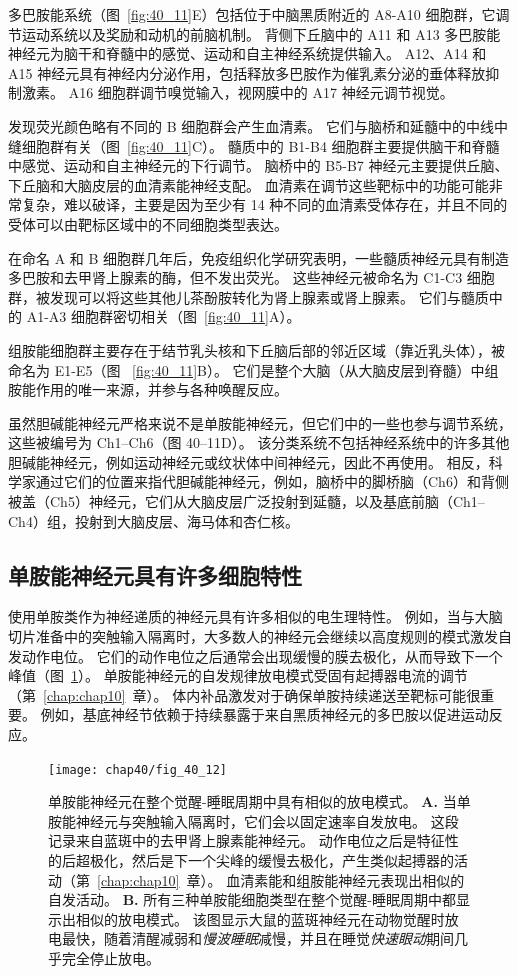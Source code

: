多巴胺能系统（图~\ref{fig:40_11}E）包括位于中脑黑质附近的 A8-A10 细胞群，它调节运动系统以及奖励和动机的前脑机制。
背侧下丘脑中的 A11 和 A13 多巴胺能神经元为脑干和脊髓中的感觉、运动和自主神经系统提供输入。
A12、A14 和 A15 神经元具有神经内分泌作用，包括释放多巴胺作为催乳素分泌的垂体释放抑制激素。
A16 细胞群调节嗅觉输入，视网膜中的 A17 神经元调节视觉。


发现荧光颜色略有不同的 B 细胞群会产生血清素。
它们与脑桥和延髓中的中线中缝细胞群有关（图~\ref{fig:40_11}C）。
髓质中的 B1-B4 细胞群主要提供脑干和脊髓中感觉、运动和自主神经元的下行调节。
脑桥中的 B5-B7 神经元主要提供丘脑、下丘脑和大脑皮层的血清素能神经支配。
血清素在调节这些靶标中的功能可能非常复杂，难以破译，主要是因为至少有 14 种不同的血清素受体存在，并且不同的受体可以由靶标区域中的不同细胞类型表达。


在命名 A 和 B 细胞群几年后，免疫组织化学研究表明，一些髓质神经元具有制造多巴胺和去甲肾上腺素的酶，但不发出荧光。
这些神经元被命名为 C1-C3 细胞群，被发现可以将这些其他儿茶酚胺转化为肾上腺素或肾上腺素。
它们与髓质中的 A1-A3 细胞群密切相关（图~\ref{fig:40_11}A）。


组胺能细胞群主要存在于结节乳头核和下丘脑后部的邻近区域（靠近乳头体），被命名为 E1-E5（图 ~\ref{fig:40_11}B）。
它们是整个大脑（从大脑皮层到脊髓）中组胺能作用的唯一来源，并参与各种唤醒反应。


虽然胆碱能神经元严格来说不是单胺能神经元，但它们中的一些也参与调节系统，这些被编号为 Ch1–Ch6（图 40–11D）。
该分类系统不包括神经系统中的许多其他胆碱能神经元，例如运动神经元或纹状体中间神经元，因此不再使用。
相反，科学家通过它们的位置来指代胆碱能神经元，例如，脑桥中的脚桥脑（Ch6）和背侧被盖（Ch5）神经元，它们从大脑皮层广泛投射到延髓，以及基底前脑（Ch1–Ch4）组，投射到大脑皮层、海马体和杏仁核。



\subsection{单胺能神经元具有许多细胞特性}

使用单胺类作为神经递质的神经元具有许多相似的电生理特性。
例如，当与大脑切片准备中的突触输入隔离时，大多数人的神经元会继续以高度规则的模式激发自发动作电位。
它们的动作电位之后通常会出现缓慢的膜去极化，从而导致下一个峰值（图~\ref{fig:40_12}）。
单胺能神经元的自发规律放电模式受固有起搏器电流的调节（第~\ref{chap:chap10}~章）。
体内补品激发对于确保单胺持续递送至靶标可能很重要。
例如，基底神经节依赖于持续暴露于来自黑质神经元的多巴胺以促进运动反应。


\begin{figure}[htbp]
	\centering
	\texttt{[image: chap40/fig\_40\_12]}
	\caption{单胺能神经元在整个觉醒-睡眠周期中具有相似的放电模式。
		\textbf{A.} 当单胺能神经元与突触输入隔离时，它们会以固定速率自发放电。
		这段记录来自蓝斑中的去甲肾上腺素能神经元。
		动作电位之后是特征性的后超极化，然后是下一个尖峰的缓慢去极化，产生类似起搏器的活动（第~\ref{chap:chap10}~章）。
		血清素能和组胺能神经元表现出相似的自发活动。
		\textbf{B.} 所有三种单胺能细胞类型在整个觉醒-睡眠周期中都显示出相似的放电模式。
		该图显示大鼠的蓝斑神经元在动物觉醒时放电最快，随着清醒减弱和\textit{慢波睡眠}减慢，并且在睡觉\textit{快速眼动}期间几乎完全停止放电\cite{aston1981activity}。}
	\label{fig:40_12}
\end{figure}


